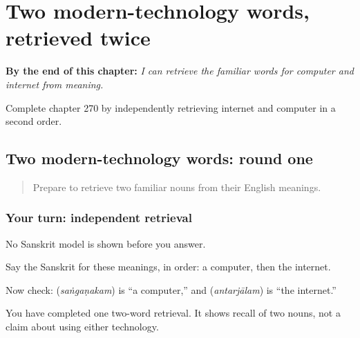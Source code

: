 
\chapter{Two modern-technology words, retrieved twice}
\label{ch:sa-modern-technology-retrieval}

\begin{chapteropening}
\textbf{By the end of this chapter:} \emph{I can retrieve the familiar words for computer and internet from meaning.}

Complete chapter 270 by independently retrieving internet and computer in a second order.
\end{chapteropening}

\section[(independent modern-technology …]{Two modern-technology words: round one}

\label{lesson:SA-C270-modern-technology-first-retrieval}



\begin{quote}
Prepare to retrieve two familiar nouns from their English meanings.
\end{quote}

\subsection*{Your turn: independent retrieval}
No Sanskrit model is shown before you answer.

Say the Sanskrit for these meanings, in order: a computer, then the internet.

\begin{grammarlens}[title={What you've built: check after answering}]
Now check: \textbf{} (\emph{saṅgaṇakam}) is “a computer,” and \textbf{} (\emph{antarjālam}) is “the internet.”
\end{grammarlens}

\begin{tcolorbox}[breakable,colback=teal!4,colframe=teal!35!black,title={Before you move on}]
You have completed one two-word retrieval. It shows recall of two nouns, not a claim about using either technology.
\end{tcolorbox}
